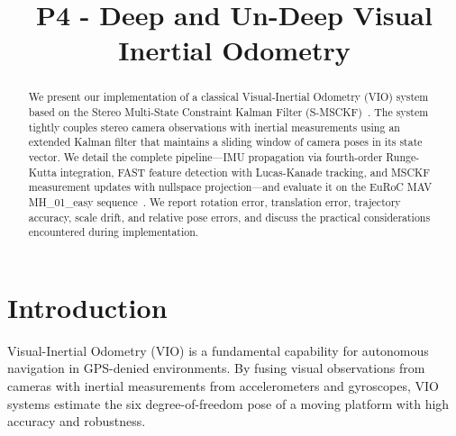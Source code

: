\documentclass[conference]{IEEEtran}
\begin{document}
\title{P4 - Deep and Un-Deep Visual Inertial Odometry}

\author{
\and
{}
\and 
{}
}

\maketitle

\begin{abstract}
We present our implementation of a classical Visual-Inertial Odometry (VIO) system based on the Stereo Multi-State Constraint Kalman Filter (S-MSCKF)~\cite{sun2018}. The system tightly couples stereo camera observations with inertial measurements using an extended Kalman filter that maintains a sliding window of camera poses in its state vector. We detail the complete pipeline---IMU propagation via fourth-order Runge-Kutta integration, FAST feature detection with Lucas-Kanade tracking, and MSCKF measurement updates with nullspace projection---and evaluate it on the EuRoC MAV MH\_01\_easy sequence~\cite{burri2016}. We report rotation error, translation error, trajectory accuracy, scale drift, and relative pose errors, and discuss the practical considerations encountered during implementation.
\end{abstract}

\IEEEpeerreviewmaketitle

\section{Introduction}

Visual-Inertial Odometry (VIO) is a fundamental capability for autonomous navigation in GPS-denied environments. By fusing visual observations from cameras with inertial measurements from accelerometers and gyroscopes, VIO systems estimate the six degree-of-freedom pose of a moving platform with high accuracy and robustness.
\end{document}
